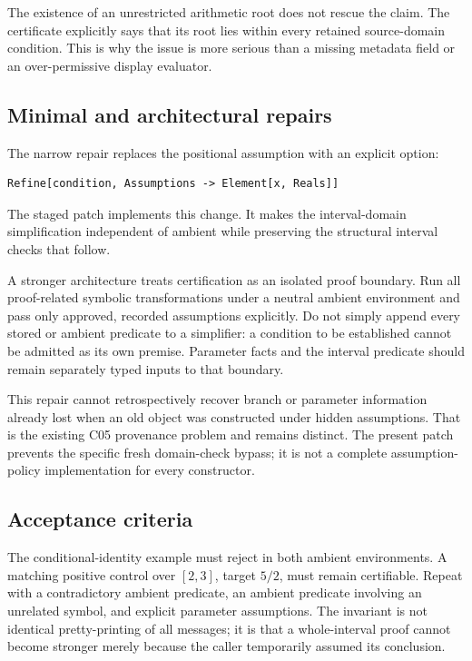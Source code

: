 \documentclass[11pt,a4paper]{article}
\newcommand{\code}[1]{\texttt{\detokenize{#1}}}
\begin{document}
The existence of an unrestricted arithmetic root does not rescue the claim. The certificate explicitly says that its root lies within every retained source-domain condition. This is why the issue is more serious than a missing metadata field or an over-permissive display evaluator.

\subsection{Minimal and architectural repairs}
The narrow repair replaces the positional assumption with an explicit option:
\begin{lstlisting}
Refine[condition, Assumptions -> Element[x, Reals]]
\end{lstlisting}
The staged patch implements this change. It makes the interval-domain simplification independent of ambient \code{$Assumptions} while preserving the structural interval checks that follow.

A stronger architecture treats certification as an isolated proof boundary. Run all proof-related symbolic transformations under a neutral ambient environment and pass only approved, recorded assumptions explicitly. Do not simply append every stored or ambient predicate to a simplifier: a condition to be established cannot be admitted as its own premise. Parameter facts and the interval predicate should remain separately typed inputs to that boundary.

This repair cannot retrospectively recover branch or parameter information already lost when an old object was constructed under hidden assumptions. That is the existing C05 provenance problem and remains distinct. The present patch prevents the specific fresh domain-check bypass; it is not a complete assumption-policy implementation for every constructor.

\subsection{Acceptance criteria}
The conditional-identity example must reject in both ambient environments. A matching positive control over \([2,3]\), target \(5/2\), must remain certifiable. Repeat with a contradictory ambient predicate, an ambient predicate involving an unrelated symbol, and explicit parameter assumptions. The invariant is not identical pretty-printing of all messages; it is that a whole-interval proof cannot become stronger merely because the caller temporarily assumed its conclusion.
\end{document}
